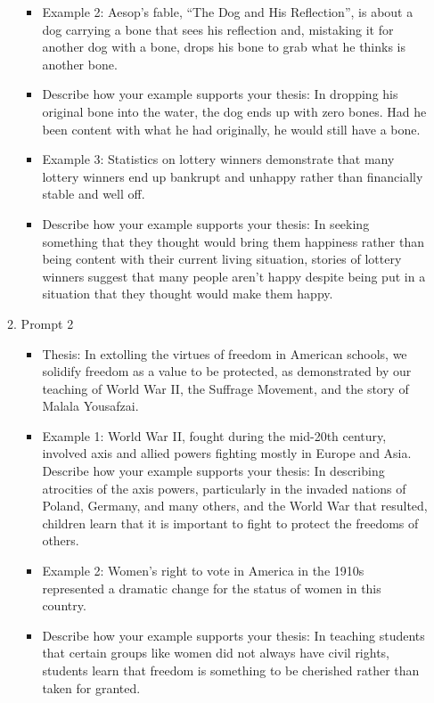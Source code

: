 \begin{enumerate}
\begin{enumerate}
\begin{itemize}
\item Example 2: Aesop's fable, ``The Dog and His Reflection'', is about a dog carrying a bone that sees his reflection and, mistaking it for another dog with a bone, drops his bone to grab what he thinks is another bone. 
\item Describe how your example supports your thesis: In dropping his original bone into the water, the dog ends up with zero bones. Had he been content with what he had originally, he would still have a bone. 

\item Example 3: Statistics on lottery winners demonstrate that many lottery winners end up bankrupt and unhappy rather than financially stable and well off. 
\item Describe how your example supports your thesis: In seeking something that they thought would bring them happiness rather than being content with their current living situation, stories of lottery winners suggest that many people aren’t happy despite being put in a situation that they thought would make them happy. 
\end{itemize}

\item Prompt 2

\begin{itemize}
\item Thesis: In extolling the virtues of freedom in American schools, we solidify freedom as a value to be protected, as demonstrated by our teaching of World War II, the Suffrage Movement, and the story of Malala Yousafzai. 
\item Example 1: World War II, fought during the mid-20th century, involved axis and allied powers fighting mostly in Europe and Asia. 
Describe how your example supports your thesis: In describing atrocities of the axis powers, particularly in the invaded nations of Poland, Germany, and many others, and the World War that resulted, children learn that it is important to fight to protect the freedoms of others. 

\item Example 2: Women's right to vote in America in the 1910s represented a dramatic change for the status of women in this country.

\item Describe how your example supports your thesis: In teaching students that certain groups like women did not always have civil rights, students learn that freedom is something to be cherished rather than taken for granted. 


\end{itemize}
\end{enumerate}
\end{enumerate}
